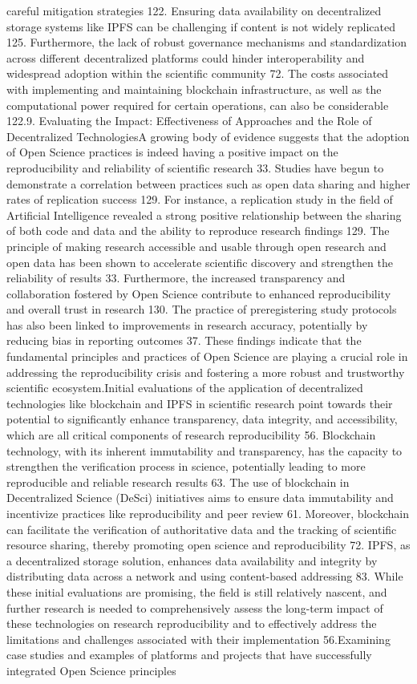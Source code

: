 \documentclass{article}
\begin{document}
careful mitigation strategies 122. Ensuring data availability on decentralized storage systems like IPFS can be challenging if content is not widely replicated 125. Furthermore, the lack of robust governance mechanisms and standardization across different decentralized platforms could hinder interoperability and widespread adoption within the scientific community 72. The costs associated with implementing and maintaining blockchain infrastructure, as well as the computational power required for certain operations, can also be considerable 122.9. Evaluating the Impact: Effectiveness of Approaches and the Role of Decentralized TechnologiesA growing body of evidence suggests that the adoption of Open Science practices is indeed having a positive impact on the reproducibility and reliability of scientific research 33. Studies have begun to demonstrate a correlation between practices such as open data sharing and higher rates of replication success 129. For instance, a replication study in the field of Artificial Intelligence revealed a strong positive relationship between the sharing of both code and data and the ability to reproduce research findings 129. The principle of making research accessible and usable through open research and open data has been shown to accelerate scientific discovery and strengthen the reliability of results 33. Furthermore, the increased transparency and collaboration fostered by Open Science contribute to enhanced reproducibility and overall trust in research 130. The practice of preregistering study protocols has also been linked to improvements in research accuracy, potentially by reducing bias in reporting outcomes 37. These findings indicate that the fundamental principles and practices of Open Science are playing a crucial role in addressing the reproducibility crisis and fostering a more robust and trustworthy scientific ecosystem.Initial evaluations of the application of decentralized technologies like blockchain and IPFS in scientific research point towards their potential to significantly enhance transparency, data integrity, and accessibility, which are all critical components of research reproducibility 56. Blockchain technology, with its inherent immutability and transparency, has the capacity to strengthen the verification process in science, potentially leading to more reproducible and reliable research results 63. The use of blockchain in Decentralized Science (DeSci) initiatives aims to ensure data immutability and incentivize practices like reproducibility and peer review 61. Moreover, blockchain can facilitate the verification of authoritative data and the tracking of scientific resource sharing, thereby promoting open science and reproducibility 72. IPFS, as a decentralized storage solution, enhances data availability and integrity by distributing data across a network and using content-based addressing 83. While these initial evaluations are promising, the field is still relatively nascent, and further research is needed to comprehensively assess the long-term impact of these technologies on research reproducibility and to effectively address the limitations and challenges associated with their implementation 56.Examining case studies and examples of platforms and projects that have successfully integrated Open Science principles 
\end{document}
